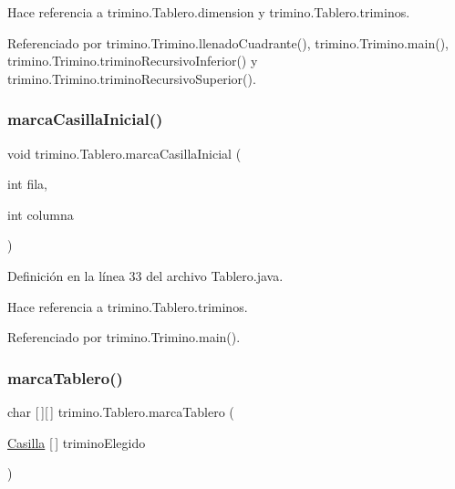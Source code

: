 Hace referencia a trimino.\+Tablero.\+dimension y trimino.\+Tablero.\+triminos.



Referenciado por trimino.\+Trimino.\+llenado\+Cuadrante(), trimino.\+Trimino.\+main(), trimino.\+Trimino.\+trimino\+Recursivo\+Inferior() y trimino.\+Trimino.\+trimino\+Recursivo\+Superior().

\mbox{\label{classtrimino_1_1Tablero_ae4bc58ebf11214c6e48b0ff7b64eb58e}} 
\subsubsection{\texorpdfstring{marcaCasillaInicial()}{marcaCasillaInicial()}}
{\footnotesize\ttfamily void trimino.\+Tablero.\+marca\+Casilla\+Inicial (\begin{DoxyParamCaption}\item[{int}]{fila,  }\item[{int}]{columna }\end{DoxyParamCaption})}



Definición en la línea 33 del archivo Tablero.\+java.


\begin{DoxyCode}{0}

\end{DoxyCode}


Hace referencia a trimino.\+Tablero.\+triminos.



Referenciado por trimino.\+Trimino.\+main().

\mbox{\label{classtrimino_1_1Tablero_a03a6bb741611d91f2e5b65ffda02d0e2}} 
\subsubsection{\texorpdfstring{marcaTablero()}{marcaTablero()}}
{\footnotesize\ttfamily char \mbox{[}$\,$\mbox{]}\mbox{[}$\,$\mbox{]} trimino.\+Tablero.\+marca\+Tablero (\begin{DoxyParamCaption}\item[{\mbox{\hyperlink{classtrimino_1_1Casilla}{Casilla}} \mbox{[}$\,$\mbox{]}}]{trimino\+Elegido }\end{DoxyParamCaption})}



